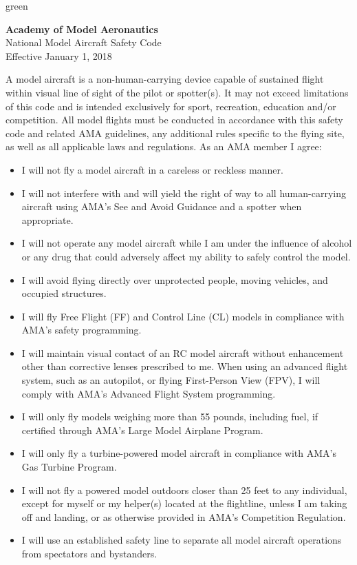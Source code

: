 \documentclass[
]{book}
\providecommand{\tightlist}{%
  \setlength{\itemsep}{0pt}\setlength{\parskip}{0pt}}
\newenvironment{content}{\hrulefill}{}{}
\newenvironment{titleB}{}{}
\begin{document}
\begin{content-box}{green}

\begin{titleB}

\textbf{Academy of Model Aeronautics}\\
National Model Aircraft Safety Code\\
Effective January 1, 2018

\end{titleB}

\begin{content}

A model aircraft is a non-human-carrying device capable of sustained flight within visual line of sight of the pilot or spotter(s). It may not exceed limitations of this code and is intended exclusively for sport, recreation, education and/or competition. All model flights must be conducted in accordance with this safety code and related AMA guidelines, any additional rules specific to the flying site, as well as all applicable laws and regulations.
As an AMA member I agree:

\begin{itemize}
\tightlist
\item
  I will not fly a model aircraft in a careless or reckless manner.
\item
  I will not interfere with and will yield the right of way to all human-carrying aircraft using AMA's See and Avoid Guidance and a spotter when appropriate.
\item
  I will not operate any model aircraft while I am under the influence of alcohol or any drug that could adversely affect my ability to safely control the model.
\item
  I will avoid flying directly over unprotected people, moving vehicles, and occupied structures.
\item
  I will fly Free Flight (FF) and Control Line (CL) models in compliance with AMA's safety programming.
\item
  I will maintain visual contact of an RC model aircraft without enhancement other than corrective lenses prescribed to me. When using an advanced flight system, such as an autopilot, or flying First-Person View (FPV), I will comply with AMA's Advanced Flight System programming.
\item
  I will only fly models weighing more than 55 pounds, including fuel, if certified through AMA's Large Model Airplane Program.
\item
  I will only fly a turbine-powered model aircraft in compliance with AMA's Gas Turbine Program.
\item
  I will not fly a powered model outdoors closer than 25 feet to any individual, except for myself or my helper(s) located at the flightline, unless I am taking off and landing, or as otherwise provided in AMA's Competition Regulation.
\item
  I will use an established safety line to separate all model aircraft operations from spectators and bystanders.
\end{itemize}


\end{content}
\end{content-box}
\end{document}
